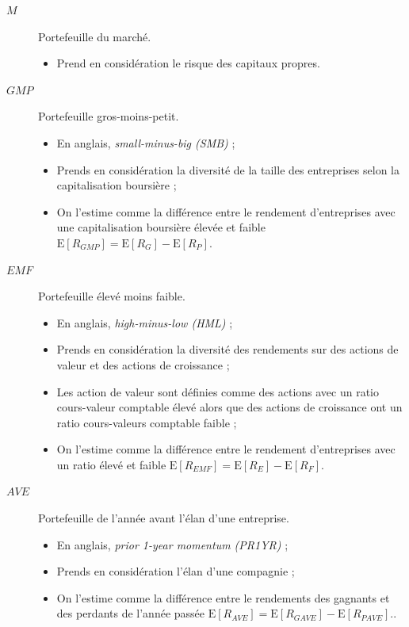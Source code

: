 \documentclass[10pt, french]{article}
\begin{document}
\begin{multicols*}{2}
\begin{definitionNOHFILL}[Notation]
\begin{description}
	\item[$M$]	Portefeuille du marché.
		\begin{itemize}
		\item	Prend en considération le risque des capitaux propres.
		\end{itemize}
	\item[$GMP$]	Portefeuille gros-moins-petit.
		\begin{itemize}
		\item	En anglais, \og \textit{small-minus-big (SMB)} \fg{} ;
		\item	Prends en considération la diversité de la taille des entreprises selon la capitalisation boursière ;
		\item	On l'estime comme la différence entre le rendement d'entreprises avec une capitalisation boursière élevée et faible $\text{E}[R_{GMP}]	=	\text{E}[R_{G}]	-	\text{E}[R_{P}]$.
		\end{itemize}
	\item[$EMF$]	Portefeuille élevé moins faible.
		\begin{itemize}
		\item	En anglais, \og \textit{high-minus-low (HML)} \fg{} ;
		\item	Prends en considération la diversité des rendements sur des actions de valeur et des actions de croissance ;
		\item	Les action de valeur sont définies comme des actions avec un ratio cours-valeur comptable élevé alors que des actions de croissance ont un ratio cours-valeurs comptable faible ;
		\item	On l'estime comme la différence entre le rendement d'entreprises avec un ratio élevé et faible $\text{E}[R_{EMF}]	=	\text{E}[R_{E}]	-	\text{E}[R_{F}]$.
		\end{itemize}
	\item[$AVE$]	Portefeuille de l'année avant l'élan d'une entreprise.
		\begin{itemize}
		\item	En anglais, \og \textit{prior 1-year momentum (PR1YR)} \fg{} ;
		\item	Prends en considération l'élan d'une compagnie ;
		\item	On l'estime comme la différence entre le rendements des gagnants et des perdants de l'année passée $\text{E}[R_{AVE}]	=	\text{E}[R_{GAVE}]	-	\text{E}[R_{PAVE}]$..
		\end{itemize}
\end{description}


\end{definitionNOHFILL}
\end{multicols*}
\end{document}
